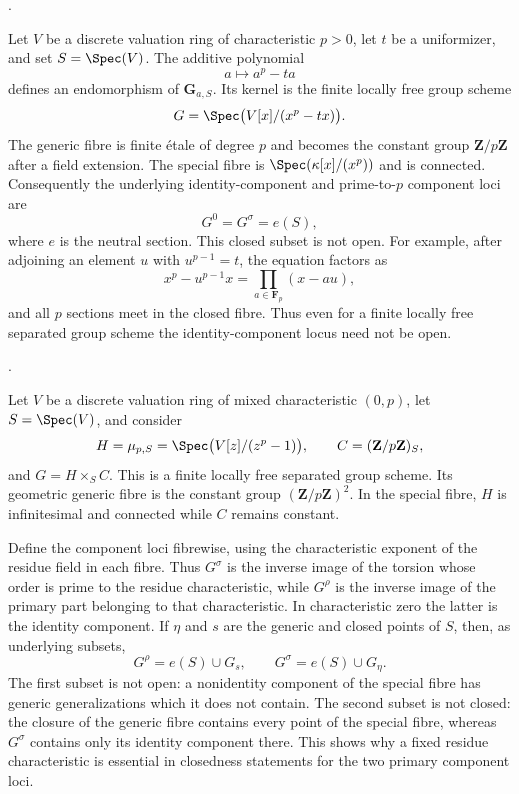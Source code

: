 \begin{example}
\label{example-additive-kernel-identity-component-not-open}
\begin{reference}
\cite[Expos\'e 236, Remark 1.9, pp. 229--230]{FGA}.
\end{reference}
Let $V$ be a discrete valuation ring of characteristic $p>0$, let $t$ be a
uniformizer, and set $S=\Spec(V)$. The additive polynomial
$$
a\longmapsto a^p-ta
$$
defines an endomorphism of $\mathbf G_{a,S}$. Its kernel is the finite locally
free group scheme
$$
G=\Spec\bigl(V[x]/(x^p-tx)\bigr).
$$
The generic fibre is finite \'etale of degree $p$ and becomes the constant
group $\mathbf Z/p\mathbf Z$ after a field extension. The special fibre is
$\Spec(\kappa[x]/(x^p))$ and is connected. Consequently the underlying
identity-component and prime-to-$p$ component loci are
$$
G^0=G^\sigma=e(S),
$$
where $e$ is the neutral section. This closed subset is not open. For
example, after adjoining an element $u$ with $u^{p-1}=t$, the equation
factors as
$$
x^p-u^{p-1}x=\prod_{a\in\mathbf F_p}(x-au),
$$
and all $p$ sections meet in the closed fibre. Thus even for a finite locally
free separated group scheme the identity-component locus need not be open.
\end{example}

\begin{example}
\label{example-mixed-characteristic-component-loci}
\begin{reference}
\cite[Expos\'e 236, Remark 1.9, p. 230]{FGA}.
\end{reference}
Let $V$ be a discrete valuation ring of mixed characteristic $(0,p)$, let
$S=\Spec(V)$, and consider
$$
H=\mu_{p,S}=\Spec\bigl(V[z]/(z^p-1)\bigr),\qquad
C=(\mathbf Z/p\mathbf Z)_S,
$$
and $G=H\times_S C$. This is a finite locally free separated group scheme.
Its geometric generic fibre is the constant group
$(\mathbf Z/p\mathbf Z)^2$. In the special fibre, $H$ is infinitesimal and
connected while $C$ remains constant.

Define the component loci fibrewise, using the characteristic exponent of
the residue field in each fibre. Thus $G^\sigma$ is the inverse image of the
torsion whose order is prime to the residue characteristic, while $G^\rho$
is the inverse image of the primary part belonging to that characteristic.
In characteristic zero the latter is the identity component. If $\eta$ and
$s$ are the generic and closed points of $S$, then, as underlying subsets,
$$
G^\rho=e(S)\cup G_s,
\qquad
G^\sigma=e(S)\cup G_\eta.
$$
The first subset is not open: a nonidentity component of the special fibre
has generic generalizations which it does not contain. The second subset is
not closed: the closure of the generic fibre contains every point of the
special fibre, whereas $G^\sigma$ contains only its identity component there.
This shows why a fixed residue characteristic is essential in closedness
statements for the two primary component loci.
\end{example}


